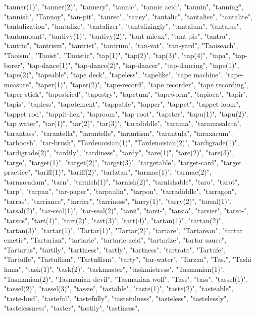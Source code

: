 "tanner(1)",
"tanner(2)",
"tannery",
"tannic",
"tannic acid",
"tannin",
"tanning",
"tannish",
"Tannoy",
"tan-pit",
"tanrec",
"tansy",
"tantalic",
"tantalise",
"tantalite",
"tantalization",
"tantalize",
"tantalizer",
"tantalizingly",
"tantalum",
"tantalus",
"tantamount",
"tantivy(1)",
"tantivy(2)",
"tant mieux",
"tant pis",
"tantra",
"tantric",
"tantrism",
"tantrist",
"tantrum",
"tan-vat",
"tan-yard",
"Taoiseach",
"Taoism",
"Taoist",
"Taoistic",
"tap(1)",
"tap(2)",
"tap(3)",
"tap(4)",
"tapa",
"tap-borer",
"tap-dance(1)",
"tap-dance(2)",
"tap-dancer",
"tap-dancing",
"tape(1)",
"tape(2)",
"tapeable",
"tape deck",
"tapeless",
"tapelike",
"tape machine",
"tape-measure",
"taper(1)",
"taper(2)",
"tape-record",
"tape recorder",
"tape recording",
"taper-stick",
"tapestried",
"tapestry",
"tapetum",
"tapeworm",
"tapioca",
"tapir",
"tapis",
"tapless",
"tapotement",
"tappable",
"tapper",
"tappet",
"tappet loom",
"tappet rod",
"tappit-hen",
"taproom",
"tap root",
"tapster",
"tapu(1)",
"tapu(2)",
"tap water",
"tar(1)",
"tar(2)",
"tar(3)",
"taradiddle",
"tarama",
"taramasalata",
"tarantass",
"tarantella",
"tarantelle",
"tarantism",
"tarantula",
"taraxacum",
"tarboosh",
"tar-brush",
"Tardenoisian(1)",
"Tardenoisian(2)",
"tardigrade(1)",
"tardigrade(2)",
"tardily",
"tardiness",
"tardy",
"tare(1)",
"tare(2)",
"tare(3)",
"targe",
"target(1)",
"target(2)",
"target(3)",
"targetable",
"target-card",
"target practice",
"tariff(1)",
"tariff(2)",
"tarlatan",
"tarmac(1)",
"tarmac(2)",
"tarmacadam",
"tarn",
"tarnish(1)",
"tarnish(2)",
"tarnishable",
"taro",
"tarot",
"tarp",
"tarpan",
"tar-paper",
"tarpaulin",
"tarpon",
"tarradiddle",
"tarragon",
"tarras",
"tarriance",
"tarrier",
"tarriness",
"tarry(1)",
"tarry(2)",
"tarsal(1)",
"tarsal(2)",
"tar-seal(1)",
"tar-seal(2)",
"tarsi",
"tarsi-",
"tarsia",
"tarsier",
"tarso-",
"tarsus",
"tart(1)",
"tart(2)",
"tart(3)",
"tart(4)",
"tartan(1)",
"tartan(2)",
"tartan(3)",
"tartar(1)",
"Tartar(1)",
"Tartar(2)",
"tartare",
"Tartarean",
"tartar emetic",
"Tartarian",
"tartaric",
"tartaric acid",
"tartarize",
"tartar sauce",
"Tartarus",
"tartily",
"tartiness",
"tartly",
"tartness",
"tartrate",
"Tartufe",
"Tartuffe",
"Tartuffian",
"Tartuffism",
"tarty",
"tar-water",
"Tarzan",
"Tas.",
"Tashi lama",
"task(1)",
"task(2)",
"taskmaster",
"taskmistress",
"Tasmanian(1)",
"Tasmanian(2)",
"Tasmanian devil",
"Tasmanian wolf",
"Tass",
"tass",
"tassel(1)",
"tassel(2)",
"tassel(3)",
"tassie",
"tastable",
"taste(1)",
"taste(2)",
"tasteable",
"taste-bud",
"tasteful",
"tastefully",
"tastefulness",
"tasteless",
"tastelessly",
"tastelessness",
"taster",
"tastily",
"tastiness",
